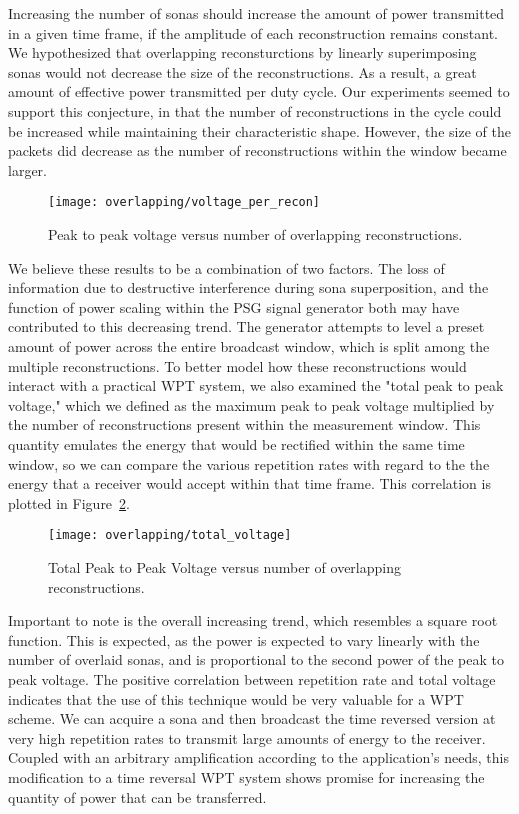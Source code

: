 Increasing the number of sonas should increase the amount of power transmitted in a given time frame, if the amplitude of each reconstruction remains constant. We hypothesized that overlapping reconsturctions by linearly superimposing sonas would not decrease the size of the reconstructions. As a result, a great amount of effective power transmitted per duty cycle. Our experiments seemed to support this conjecture, in that the number of reconstructions in the cycle could be increased while maintaining their characteristic shape. However, the size of the packets did decrease as the number of reconstructions within the window became larger.
\begin{figure}[t]
\centering
\texttt{[image: overlapping/voltage\_per\_recon]}
\caption[Max Vpp from overlapping reconstructions]{Peak to peak voltage versus number of overlapping reconstructions.}
\label{fig:overlapping-vpp}
\end{figure}
We believe these results to be a combination of two factors. The loss of information due to destructive interference during sona superposition, and the function of power scaling within the PSG signal generator both may have contributed to this decreasing trend. The generator attempts to level a preset amount of power across the entire broadcast window, which is split among the multiple reconstructions. 
To better model how these reconstructions would interact with a practical WPT system, we also examined the "total peak to peak voltage," which we defined as the maximum peak to peak voltage multiplied by the number of reconstructions present within the measurement window. This quantity emulates the energy that would be rectified within the same time window, so we can compare the various repetition rates with regard to the the energy that a receiver would accept within that time frame. This correlation is plotted in Figure~\ref{fig:overlapping-total-voltage}.

\begin{figure}[t]
\centering
\texttt{[image: overlapping/total\_voltage]}
\caption[Max Vpp from overlapping reconstructions]{Total Peak to Peak Voltage versus number of overlapping reconstructions.}
\label{fig:overlapping-total-voltage}
\end{figure}

Important to note is the overall increasing trend, which resembles a square root function. This is expected, as the power is expected to vary linearly with the number of overlaid sonas, and is proportional to the second power of the peak to peak voltage. The positive correlation between repetition rate and total voltage indicates that the use of this technique would be very valuable for a WPT scheme. We can acquire a sona and then broadcast the time reversed version at very high repetition rates to transmit large amounts of energy to the receiver. Coupled with an arbitrary amplification according to the application's needs, this modification to a time reversal WPT system shows promise for increasing the quantity of power that can be transferred.

